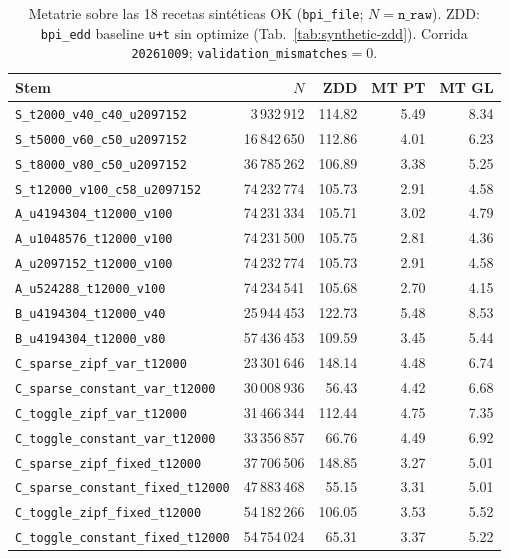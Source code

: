 \begin{table}[htbp]
\centering
\caption{Metatrie sobre las 18 recetas sintéticas OK (\texttt{bpi\_file}; $N=\texttt{n\_raw}$).
ZDD: \texttt{bpi\_edd} baseline \texttt{u+t} sin optimize (Tab.~\ref{tab:synthetic-zdd}).
Corrida \texttt{20261009}; \texttt{validation\_mismatches}$=0$.}
\label{tab:metatrie-results}
\scriptsize
\begin{tabular}{@{}l r r r r@{}}
\hline
Stem & $N$ & ZDD & MT PT & MT GL \\
\hline
\texttt{S_t2000_v40_c40_u2097152} & 3\,932\,912 & 114.82 & 5.49 & 8.34 \\
\texttt{S_t5000_v60_c50_u2097152} & 16\,842\,650 & 112.86 & 4.01 & 6.23 \\
\texttt{S_t8000_v80_c50_u2097152} & 36\,785\,262 & 106.89 & 3.38 & 5.25 \\
\texttt{S_t12000_v100_c58_u2097152} & 74\,232\,774 & 105.73 & 2.91 & 4.58 \\
\texttt{A_u4194304_t12000_v100} & 74\,231\,334 & 105.71 & 3.02 & 4.79 \\
\texttt{A_u1048576_t12000_v100} & 74\,231\,500 & 105.75 & 2.81 & 4.36 \\
\texttt{A_u2097152_t12000_v100} & 74\,232\,774 & 105.73 & 2.91 & 4.58 \\
\texttt{A_u524288_t12000_v100} & 74\,234\,541 & 105.68 & 2.70 & 4.15 \\
\texttt{B_u4194304_t12000_v40} & 25\,944\,453 & 122.73 & 5.48 & 8.53 \\
\texttt{B_u4194304_t12000_v80} & 57\,436\,453 & 109.59 & 3.45 & 5.44 \\
\texttt{C_sparse_zipf_var_t12000} & 23\,301\,646 & 148.14 & 4.48 & 6.74 \\
\texttt{C_sparse_constant_var_t12000} & 30\,008\,936 & 56.43 & 4.42 & 6.68 \\
\texttt{C_toggle_zipf_var_t12000} & 31\,466\,344 & 112.44 & 4.75 & 7.35 \\
\texttt{C_toggle_constant_var_t12000} & 33\,356\,857 & 66.76 & 4.49 & 6.92 \\
\texttt{C_sparse_zipf_fixed_t12000} & 37\,706\,506 & 148.85 & 3.27 & 5.01 \\
\texttt{C_sparse_constant_fixed_t12000} & 47\,883\,468 & 55.15 & 3.31 & 5.01 \\
\texttt{C_toggle_zipf_fixed_t12000} & 54\,182\,266 & 106.05 & 3.53 & 5.52 \\
\texttt{C_toggle_constant_fixed_t12000} & 54\,754\,024 & 65.31 & 3.37 & 5.22 \\
\hline
\end{tabular}
\end{table}



